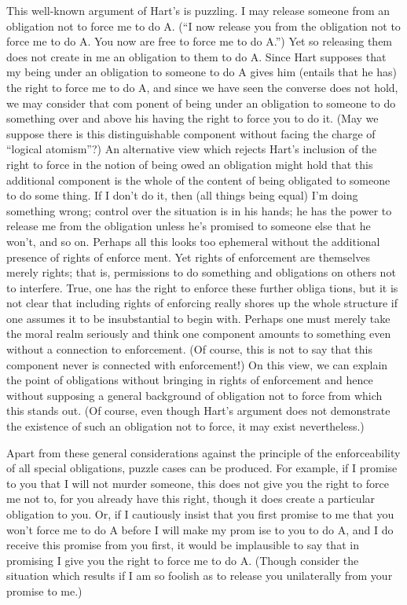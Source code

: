 \documentclass[11pt,openany]{book}
\begin{document}
This well-known argument of Hart's is puzzling. I may release someone from an obligation not to force me to do A. (``I now release you from the obligation not to force me to do A. You now are free to force me to do A.'') Yet so releasing them does not create in me an obligation to them to do A. Since Hart supposes that my being under an obligation to someone to do A gives him (entails that he has) the right to force me to do A, and since we have seen the converse does not hold, we may consider that com ponent of being under an obligation to someone to do something over and above his having the right to force you to do it. (May we suppose there is this distinguishable component without facing the charge of ``logical atomism''?) An alternative view which rejects Hart's inclusion of the right to force in the notion of being owed an obligation might hold that this additional component is the whole of the content of being obligated to someone to do some thing. If I don't do it, then (all things being equal) I'm doing something wrong; control over the situation is in his hands; he has the power to release me from the obligation unless he's promised to someone else that he won't, and so on. Perhaps all this looks too ephemeral without the additional presence of rights of enforce ment. Yet rights of enforcement are themselves merely rights; that is, permissions to do something and obligations on others not to interfere. True, one has the right to enforce these further obliga tions, but it is not clear that including rights of enforcing really shores up the whole structure if one assumes it to be insubstantial to begin with. Perhaps one must merely take the moral realm seriously and think one component amounts to something even without a connection to enforcement. (Of course, this is not to say that this component never is connected with enforcement!) On this view, we can explain the point of obligations without bringing in rights of enforcement and hence without supposing a general background of obligation not to force from which this stands out. (Of course, even though Hart's argument does not demonstrate the existence of such an obligation not to force, it may exist nevertheless.) 

Apart from these general considerations against the principle of the enforceability of all special obligations, puzzle cases can be produced. For example, if I promise to you that I will not murder someone, this does not give you the right to force me not to, for you already have this right, though it does create a particular obligation to you. Or, if I cautiously insist that you first promise to me that you won't force me to do A before I will make my prom ise to you to do A, and I do receive this promise from you first, it would be implausible to say that in promising I give you the right to force me to do A. (Though consider the situation which results if I am so foolish as to release you unilaterally from your promise to me.) 
\end{document}
